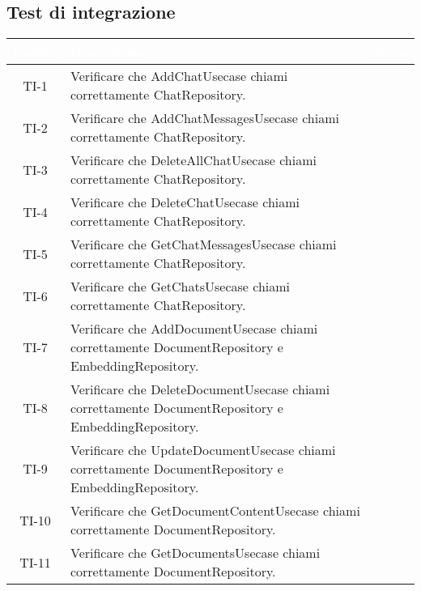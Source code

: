\newpage
\subsection{Test di integrazione}

\begingroup
\setlength{\tabcolsep}{10pt}
\renewcommand{\arraystretch}{1.5}
\begin{xltabular}{\textwidth}{| c | X | c |}
    \hline
     \textbf{\textcolor{white}{Codice}} & \textbf{\textcolor{white}{Descrizione}} & \textbf{\textcolor{white}{Stato}}\\
    \hline
    \endhead
    TI-1 & Verificare che AddChatUsecase chiami correttamente ChatRepository. & \textcolor{cmarkcolor}{} \\
    \hline
    TI-2 & Verificare che AddChatMessagesUsecase chiami correttamente ChatRepository. & \textcolor{cmarkcolor}{} \\
    \hline
    TI-3 & Verificare che DeleteAllChatUsecase chiami correttamente ChatRepository. & \textcolor{cmarkcolor}{} \\
    \hline
    TI-4 & Verificare che DeleteChatUsecase chiami correttamente ChatRepository. & \textcolor{cmarkcolor}{} \\
    \hline
    TI-5 & Verificare che GetChatMessagesUsecase chiami correttamente ChatRepository. & \textcolor{cmarkcolor}{} \\
    \hline
    TI-6 & Verificare che GetChatsUsecase chiami correttamente ChatRepository. & \textcolor{cmarkcolor}{} \\
    \hline
    TI-7 & Verificare che AddDocumentUsecase chiami correttamente DocumentRepository e EmbeddingRepository. & \textcolor{cmarkcolor}{} \\
    \hline
    TI-8 & Verificare che DeleteDocumentUsecase chiami correttamente DocumentRepository e EmbeddingRepository. & \textcolor{cmarkcolor}{} \\
    \hline
    TI-9 & Verificare che UpdateDocumentUsecase chiami correttamente DocumentRepository e EmbeddingRepository. & \textcolor{cmarkcolor}{} \\
    \hline
    TI-10 & Verificare che GetDocumentContentUsecase chiami correttamente DocumentRepository. & \textcolor{cmarkcolor}{} \\
    \hline
    TI-11 & Verificare che GetDocumentsUsecase chiami correttamente DocumentRepository. & \textcolor{cmarkcolor}{} \\

\end{xltabular}
